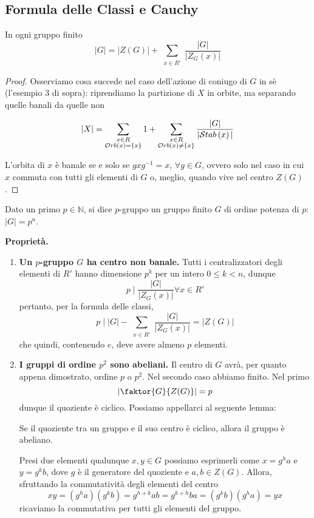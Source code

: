 \subsection{Formula delle Classi e Cauchy}
\begin{multicols}{2}

\begin{theorem}
	In ogni gruppo finito
	\[ |G| = |Z(G)| + \sum_{\substack{x \in R'}} \frac{|G|}{|Z_G(x)|} \]
\end{theorem}
\begin{proof}
	Osserviamo cosa succede nel caso dell'azione di coniugo di $ G $ in sè (l'esempio 3 di sopra): riprendiamo la partizione di $ X $ in orbite, ma separando quelle banali da quelle non
	
	\[ |X| = \sum_{\substack{x \in R \\ \mathcal{O}rb\left( x \right) = \{x\} }} 1 + \sum_{\substack{x \in R \\ \mathcal{O}rb\left( x \right) \neq \{x\} }} \frac{|G|}{|\mathcal{S}tab\left( x \right)|} \]
	
	L'orbita di $ x $ è banale se e solo se $ gxg^{-1} = x $, $ \forall g \in G $, ovvero solo nel caso in cui $ x $ commuta con tutti gli elementi di $ G $ o, meglio, quando vive nel centro $ Z(G) $.
\end{proof}

\begin{definition}[$ p $-gruppo]
	Dato un primo $ p \in \mathbb{N} $, si dice $ p $-gruppo un gruppo finito $ G $ di ordine potenza di $ p $: $ |G| = p^n $.
\end{definition}

\textbf{Proprietà.}
\begin{enumerate}
	\item \textbf{Un $ p $-gruppo $ G $ ha centro non banale.} Tutti i centralizzatori degli elementi di $ R' $ hanno dimensione $ p^k $ per un intero $ 0 \leq k < n $, dunque
	\[ p \mid \frac{|G|}{|Z_G(x)|} \forall x \in R' \]
	pertanto, per la formula delle classi,
	\[ p \mid |G| - \sum_{\substack{x \in R'}} \frac{|G|}{|Z_G(x)|} = |Z(G)| \]
	che quindi, contenendo $ e $, deve avere almeno $ p $ elementi.
	
	\item \textbf{I gruppi di ordine $ p^2 $ sono abeliani.} Il centro di $ G $ avrà, per quanto appena dimostrato, ordine $ p $ o $ p^2 $. Nel secondo caso abbiamo finito. Nel primo \[  \left|\faktor{G}{Z(G)}\right| = p \] dunque il quoziente è ciclico. Possiamo appellarci al seguente lemma:
	\begin{prop}
		Se il quoziente tra un gruppo e il suo centro è ciclico, allora il gruppo è abeliano.
	\end{prop}
	Presi due elementi qualunque $ x, y \in G $ possiamo esprimerli come $ x = g^h a $ e $ y = g^k b $, dove $ g $ è il generatore del quoziente e $ a, b \in Z(G) $. Allora, sfruttando la commutatività degli elementi del centro \[ xy = (g^h a) (g^k b) = g^{h+k} ab = g^{k+h} ba = (g^k b) (g^h a) = yx \]
	ricaviamo la commutativa per tutti gli elementi del gruppo.
	

\end{enumerate}
\end{multicols}
